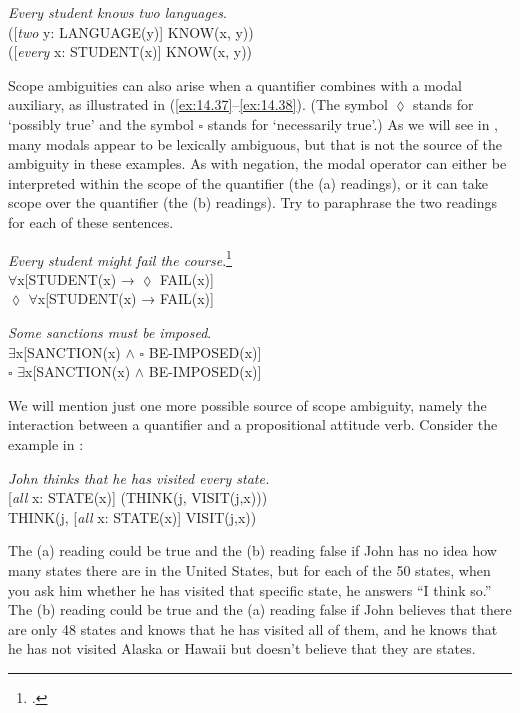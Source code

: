 \ea \label{ex:14.36}
\textit{Every student knows two languages}.\\
 ([\textit{two} y: LANGUAGE(y)] KNOW(x, y))\\
 ([\textit{every} x: STUDENT(x)] KNOW(x, y))
                       \z
\z


Scope ambiguities can also arise when a quantifier combines with a modal auxiliary, as illustrated in (\ref{ex:14.37}--\ref{ex:14.38}). (The symbol ${\lozenge}$ stands for ‘possibly true’ and the symbol ${\square}$ stands for ‘necessarily true’.) As we will see in , many modals appear to be lexically ambiguous, but that is not the source of the ambiguity in these examples. As with negation, the modal operator can either be interpreted within the scope of the quantifier (the (a) readings), or it can take scope over the quantifier (the (b) readings). Try to paraphrase the two readings for each of these sentences.


\ea \label{ex:14.37}
\textit{Every student might fail the course}.\footnote{\citet[48]{Abbott2010}.}\\
\ea ${\forall}$x[STUDENT(x) → ${\lozenge}$ FAIL(x)]\\
\ex ${\lozenge}$ ${\forall}$x[STUDENT(x) → FAIL(x)]
\z \z

\ea \label{ex:14.38}
\textit{Some sanctions must be imposed}.\\
\ea ${\exists}$x[SANCTION(x) $\wedge$ ${\square}$ BE-IMPOSED(x)]\\
\ex ${\square}$ ${\exists}$x[SANCTION(x) $\wedge$ BE-IMPOSED(x)]
\z \z


We will mention just one more possible source of scope ambiguity, namely the interaction between a quantifier and a propositional attitude verb. Consider the example in :


\ea \label{ex:14.39}
\textit{John thinks that he has visited every state.}\\
\ea \label{ex:14.}  [\textit{all} x: STATE(x)] (THINK(j, VISIT(j,x)))\\
\ex  THINK(j, [\textit{all} x: STATE(x)] VISIT(j,x))
                       \z
\z


The (a) reading could be true and the (b) reading false if John has no idea how many states there are in the United States, but for each of the 50 states, when you ask him whether he has visited that specific state, he answers “I think so.” The (b) reading could be true and the (a) reading false if John believes that there are only 48 states and knows that he has visited all of them, and he knows that he has not visited Alaska or Hawaii but doesn’t believe that they are states.



